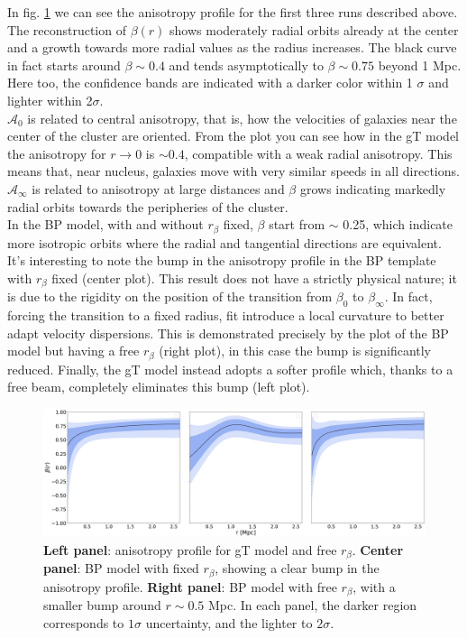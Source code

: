 In fig. \ref{fig:anisotropy_profiles} we can see the anisotropy profile for the first three runs described above. The reconstruction of $\beta(r)$ shows moderately radial orbits already at the center and a growth towards more radial values as the radius increases. The black curve in fact starts around $\beta \sim 0.4$ and tends asymptotically to $\beta \sim 0.75$ beyond 1 Mpc. Here too, the confidence bands are indicated with a darker color within 1 $\sigma$ and lighter within 2$\sigma$.\\
$\mathcal{A}_0$ is related to central anisotropy, that is, how the velocities of galaxies near the center of the cluster are oriented. From the plot you can see how in the gT model the anisotropy for $r \rightarrow 0$ is $\sim 0.4$, compatible with a weak radial anisotropy. This means that, near nucleus, galaxies move with very similar speeds in all directions.\\
$\mathcal{A}_\infty$ is related to anisotropy at large distances and $\beta$ grows indicating markedly radial orbits towards the peripheries of the cluster.\\ In the BP model, with and without $r_\beta$ fixed, $\beta$ start from $\sim$ 0.25, which indicate more isotropic orbits where the radial and tangential directions are equivalent.\\
It’s interesting to note the bump in the anisotropy profile in the BP template with $r_\beta$ fixed (center plot). This result does not have a strictly physical nature; it is due to the rigidity on the position of the transition from $\beta_0$ to $\beta_\infty$. In fact, forcing the transition to a fixed radius, fit introduce a local curvature to better adapt velocity dispersions. This is demonstrated precisely by the plot of the BP model but having a free $r_\beta$ (right plot), in this case the bump is significantly reduced.
Finally, the gT model instead adopts a softer profile which, thanks to a free beam, completely eliminates this bump (left plot).

\begin{figure}[h!]
    \centering
    \includegraphics[width=1.0\linewidth]{Images/Chapter4/anisotropia.png}
    \caption[Comparison between anisotropy profile for each anisotropy model and $r_\beta$]{
    \textbf{Left panel}: anisotropy profile for gT model and free $r_\beta$. 
    \textbf{Center panel}: BP model with fixed $r_\beta$, showing a clear bump in the anisotropy profile. 
    \textbf{Right panel}: BP model with free $r_\beta$, with a smaller bump around $r \sim 0.5$ Mpc. 
    In each panel, the darker region corresponds to $1\sigma$ uncertainty, and the lighter to $2\sigma$.
    }
    \label{fig:anisotropy_profiles}
\end{figure}